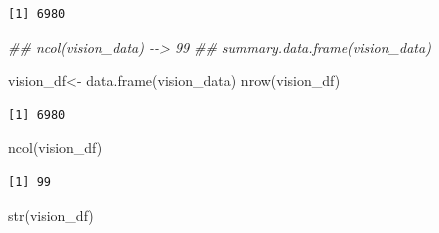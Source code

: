 \documentclass[
  12pt,
]{article}
\newenvironment{Shaded}{\begin{snugshade}}{\end{snugshade}}
\newcommand{\DocumentationTok}[1]{\textcolor[rgb]{0.37,0.37,0.37}{\textit{#1}}}
\newcommand{\FunctionTok}[1]{\textcolor[rgb]{0.28,0.35,0.67}{#1}}
\newcommand{\NormalTok}[1]{\textcolor[rgb]{0.00,0.23,0.31}{#1}}
\newcommand{\OtherTok}[1]{\textcolor[rgb]{0.00,0.23,0.31}{#1}}
\begin{document}
\begin{verbatim}
[1] 6980
\end{verbatim}

\begin{Shaded}
\begin{Highlighting}[]
\DocumentationTok{\#\# ncol(vision\_data) {-}{-}\textgreater{} 99 }
\DocumentationTok{\#\# summary.data.frame(vision\_data)  }
\end{Highlighting}
\end{Shaded}

\begin{Shaded}
\begin{Highlighting}[]
\NormalTok{vision\_df}\OtherTok{\textless{}{-}} \FunctionTok{data.frame}\NormalTok{(vision\_data)}
\FunctionTok{nrow}\NormalTok{(vision\_df)}
\end{Highlighting}
\end{Shaded}

\begin{verbatim}
[1] 6980
\end{verbatim}

\begin{Shaded}
\begin{Highlighting}[]
\FunctionTok{ncol}\NormalTok{(vision\_df)}
\end{Highlighting}
\end{Shaded}

\begin{verbatim}
[1] 99
\end{verbatim}

\begin{Shaded}
\begin{Highlighting}[]
\FunctionTok{str}\NormalTok{(vision\_df)}
\end{Highlighting}
\end{Shaded}
\end{document}
